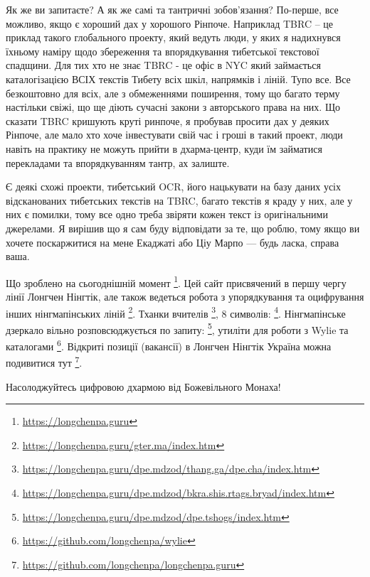 Як же ви запитаєте? А як же самі та тантричні зобов'язання? По-перше, все можливо, якщо є хороший дах у хорошого Рінпоче. Наприклад TBRC – це приклад такого глобального проекту, який ведуть люди, у яких я надихнувся їхньому наміру щодо збереження та впорядкування тибетської текстової спадщини. Для тих хто не знає TBRC - це офіс в NYC який займається каталогізацією ВСІХ текстів Тибету всіх шкіл, напрямків і ліній. Тупо все. Все безкоштовно для всіх, але з обмеженнями поширення, тому що багато терму настільки свіжі, що ще діють сучасні закони з авторського права на них. Що сказати TBRC кришують круті ринпоче, я пробував просити дах у деяких Рінпоче, але мало хто хоче інвестувати свій час і гроші в такий проект, люди навіть на практику не можуть прийти в дхарма-центр, куди їм займатися перекладами та впорядкуванням тантр, ах залиште.

Є деякі схожі проекти, тибетський OCR,
його нацькувати на базу даних усіх відсканованих
тибетських текстів на TBRC, багато текстів я краду
у них, але у них є помилки, тому все одно
треба звіряти кожен текст із оригінальними джерелами.
Я вирішив що я сам буду відповідати за те, що роблю,
тому якщо ви хочете поскаржитися на мене Екаджаті
або Ціу Марпо --- будь ласка, справа ваша.

Що зроблено на сьогоднішній момент \footnote{\url{https://longchenpa.guru}}.
Цей сайт присвячений в першу чергу лінії Лонгчен Нінгтік,
але також ведеться робота з упорядкування та оцифрування інших
нінгмапінських ліній \footnote{\url{https://longchenpa.guru/gter.ma/index.htm}}.
Тханки вчителів \footnote{\url{https://longchenpa.guru/dpe.mdzod/thang.ga/dpe.cha/index.htm}},
8 символів: \footnote{\url{https://longchenpa.guru/dpe.mdzod/bkra.shis.rtags.bryad/index.htm}}.
Нінгмапінське дзеркало вільно розповсюджується по
запиту: \footnote{\url{https://longchenpa.guru/dpe.mdzod/dpe.tshogs/index.htm}},
утиліти для роботи з Wylie та каталогами \footnote{\url{https://github.com/longchenpa/wylie}}.
Відкриті позиції (вакансії) в Лонгчен Нінгтік Україна
можна подивитися тут \footnote{\url{https://github.com/longchenpa/longchenpa.guru}}.

Насолоджуйтесь цифровою дхармою від Божевільного Монаха!